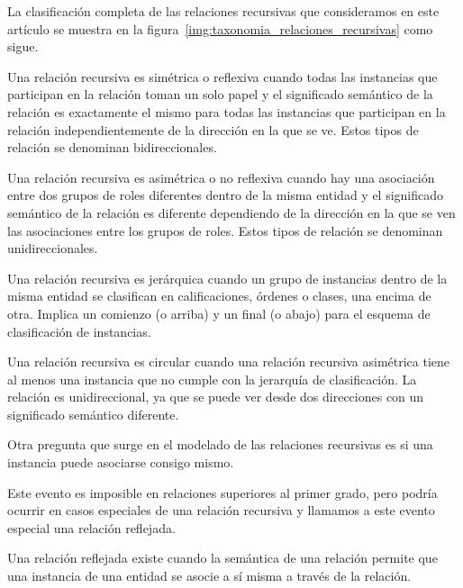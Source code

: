 La clasificación completa de las relaciones recursivas que consideramos en este artículo se muestra en la figura~\ref{img:taxonomia_relaciones_recursivas} como sigue.


Una relación recursiva es simétrica o reflexiva cuando todas las instancias que participan en la relación toman un solo papel y el significado semántico de la relación es exactamente el mismo para todas las instancias que participan en la relación independientemente de la dirección en la que se ve. Estos tipos de relación se denominan bidireccionales.


Una relación recursiva es asimétrica o no reflexiva cuando hay una asociación entre dos grupos de roles diferentes dentro de la misma entidad y el significado semántico de la relación es diferente dependiendo de la dirección en la que se ven las asociaciones entre los grupos de roles. Estos tipos de relación se denominan unidireccionales.


Una relación recursiva es jerárquica cuando un grupo de instancias dentro de la misma entidad se clasifican en calificaciones, órdenes o clases, una encima de otra. Implica un comienzo (o arriba) y un final (o abajo) para el esquema de clasificación de instancias.


Una relación recursiva es circular cuando una relación recursiva asimétrica tiene al menos una instancia que no cumple con la jerarquía de clasificación. La relación es unidireccional, ya que se puede ver desde dos direcciones con un significado semántico diferente.


Otra pregunta que surge en el modelado de las relaciones recursivas es si una instancia
puede asociarse consigo mismo. 


Este evento es imposible en relaciones superiores al primer grado, pero podría ocurrir en casos especiales de una relación recursiva y llamamos a este evento especial una relación reflejada. 

Una relación reflejada existe cuando la semántica de una relación permite que una instancia de una entidad se asocie a sí misma a través de la relación.


